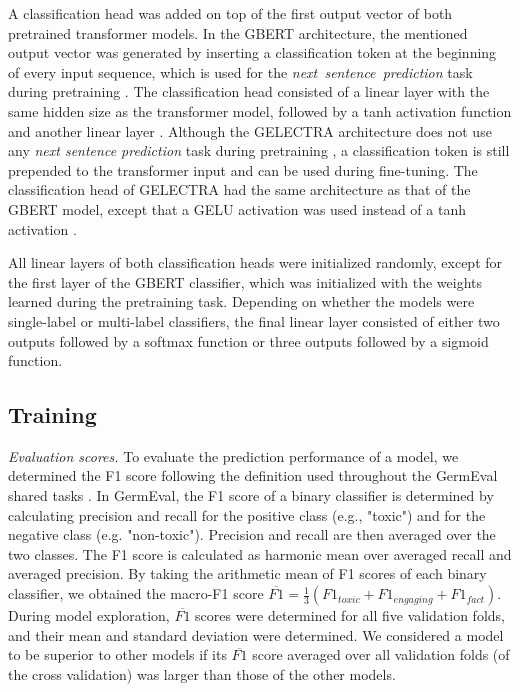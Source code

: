 \documentclass[11pt,a4paper]{article}
\begin{document}
A classification head was added on top of the first output vector of both pretrained transformer models. 
In the GBERT architecture, the mentioned output vector was generated by inserting a classification token at the beginning of every input sequence, which is used for the \mbox{\emph{next sentence prediction}} task during pretraining \cite{Devlin2018}.
The classification head consisted of a linear layer with the same hidden size as the transformer model, followed by a tanh activation function and another linear layer \cite{Wolf2020}.
Although the GELECTRA architecture does not use any \emph{next sentence prediction} task during pretraining \cite{Clark2020}, a classification token is still prepended to the transformer input and can be used during fine-tuning.
The classification head of GELECTRA had the same architecture as that of the GBERT model, except that a GELU activation \cite{Hendrycks2016} was used instead of a tanh activation \cite{Wolf2020}.

All linear layers of both classification heads were initialized randomly, except for the first layer of the GBERT classifier, which was initialized with the weights learned during the pretraining task.
Depending on whether the models were single-label or  multi-label classifiers, the final linear layer consisted of either two outputs followed by a softmax function or three outputs followed by a sigmoid function.


\subsection{Training}
\label{sec:training}

\emph{Evaluation scores.} To evaluate the prediction performance of a model, we determined the F1 score  following the definition used throughout the GermEval shared tasks \citep{Wiegand2021}. In GermEval, the F1 score of a binary classifier is determined by calculating precision and recall for the positive class (e.g., "toxic") and for the negative class (e.g. "non-toxic"). Precision and recall are then averaged over the two classes. The F1 score is calculated as harmonic mean over averaged recall and averaged precision. By taking the arithmetic mean of F1 scores of each binary classifier, we obtained the macro-F1 score $\overline{F1} = \frac{1}{3} (F1_{toxic} + F1_{engaging} + F1_{fact})$.
During model exploration, $\overline{F1}$ scores were determined for all five validation folds, and their mean and standard deviation were determined.
We considered a model to be superior to other models if its $\overline{F1}$ score averaged over all validation folds (of the cross validation) was larger than those of the other models.
\end{document}
